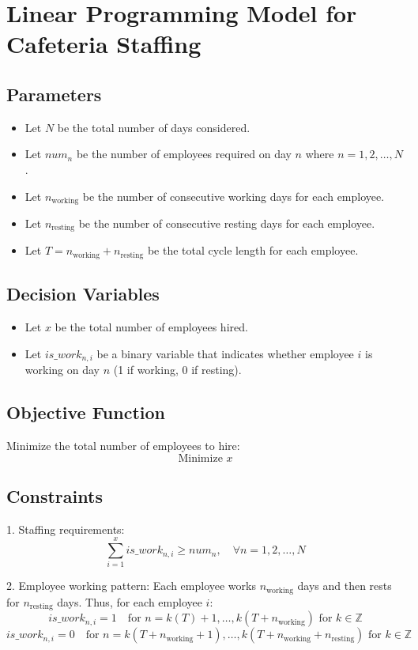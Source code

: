 \documentclass{article}
\begin{document}
\section*{Linear Programming Model for Cafeteria Staffing}

\subsection*{Parameters}
\begin{itemize}
    \item Let \( N \) be the total number of days considered.
    \item Let \( num_n \) be the number of employees required on day \( n \) where \( n = 1, 2, \ldots, N \).
    \item Let \( n_{\text{working}} \) be the number of consecutive working days for each employee.
    \item Let \( n_{\text{resting}} \) be the number of consecutive resting days for each employee.
    \item Let \( T = n_{\text{working}} + n_{\text{resting}} \) be the total cycle length for each employee.
\end{itemize}

\subsection*{Decision Variables}
\begin{itemize}
    \item Let \( x \) be the total number of employees hired.
    \item Let \( is\_work_{n,i} \) be a binary variable that indicates whether employee \( i \) is working on day \( n \) (1 if working, 0 if resting).
\end{itemize}

\subsection*{Objective Function}
Minimize the total number of employees to hire:
\[
\text{Minimize } x
\]

\subsection*{Constraints}
1. Staffing requirements:
\[
\sum_{i=1}^{x} is\_work_{n,i} \geq num_n, \quad \forall n = 1, 2, \ldots, N
\]

2. Employee working pattern:
Each employee works \( n_{\text{working}} \) days and then rests for \( n_{\text{resting}} \) days. Thus, for each employee \( i \):
\[
is\_work_{n,i} = 1 \quad \text{for } n = k(T) + 1, \ldots, k(T + n_{\text{working}}) \text{ for } k \in \mathbb{Z}
\]
\[
is\_work_{n,i} = 0 \quad \text{for } n = k(T + n_{\text{working}} + 1), \ldots, k(T + n_{\text{working}} + n_{\text{resting}}) \text{ for } k \in \mathbb{Z}
\]
\end{document}
